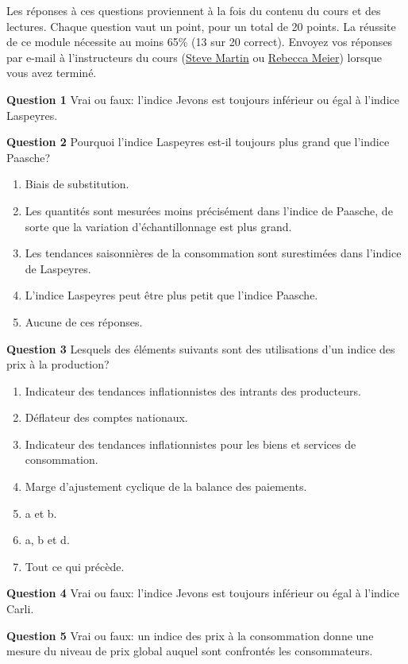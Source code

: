 \documentclass[]{article}
\begin{document}
Les réponses à ces questions proviennent à la fois du contenu du cours et des lectures. Chaque question vaut un point, pour un total de 20 points. La réussite de ce module nécessite au moins 65\% (13 sur 20 correct). Envoyez vos réponses par e-mail à l'instructeurs du cours (\href{mailto:steve.martin5@canada.ca}{Steve Martin} ou \href{mailto:rebecca.meier@canada.ca}{Rebecca Meier}) lorsque vous avez terminé.

\textbf{Question 1} Vrai ou faux: l'indice Jevons est toujours inférieur ou égal à l'indice Laspeyres.

\textbf{Question 2} Pourquoi l'indice Laspeyres est-il toujours plus grand que l'indice Paasche?

\begin{enumerate}
\def\labelenumi{\alph{enumi})}
\item
  Biais de substitution.
\item
  Les quantités sont mesurées moins précisément dans l'indice de Paasche, de sorte que la variation d'échantillonnage est
  plus grand.
\item
  Les tendances saisonnières de la consommation sont surestimées dans l'indice de Laspeyres.
\item
  L'indice Laspeyres peut être plus petit que l'indice Paasche.
\item
  Aucune de ces réponses.
\end{enumerate}

\textbf{Question 3} Lesquels des éléments suivants sont des utilisations d'un indice des prix à la production?

\begin{enumerate}
\def\labelenumi{\alph{enumi})}
\item
  Indicateur des tendances inflationnistes des intrants des producteurs.
\item
  Déflateur des comptes nationaux.
\item
  Indicateur des tendances inflationnistes pour les biens et services de consommation.
\item
  Marge d'ajustement cyclique de la balance des paiements.
\item
  a et b.
\item
  a, b et d.
\item
  Tout ce qui précède.
\end{enumerate}

\textbf{Question 4} Vrai ou faux: l'indice Jevons est toujours inférieur ou égal à l'indice Carli.

\textbf{Question 5} Vrai ou faux: un indice des prix à la consommation donne une mesure du niveau de prix global auquel sont confrontés les consommateurs.
\end{document}
